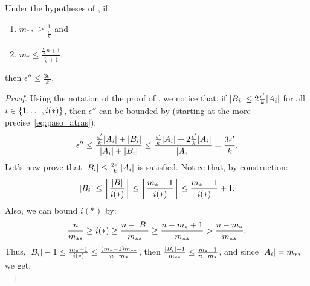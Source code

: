         \begin{remark} \label{rmk:epsilons_proportion_can_be_k}
            Under the hypotheses of , if:
            \begin{enumerate}[label=(\alph*), ref=\alph*]
                \item \label{itm:epsilons_proportion_can_be_k.a} $m_{**} \geq \frac{1}{\frac{\epsilon'}{k}}$ and
                \item \label{itm:epsilons_proportion_can_be_k.b} $m_* \leq \frac{\frac{\epsilon'}{k} n + 1}{\frac{\epsilon'}{k} + 1}$,
            \end{enumerate}
            then $\epsilon'' \leq \frac{3 \epsilon'}{k}$.
            \begin{proof}
                Using the notation of the proof of ,
                we notice that, if $| B_i | \leq 2 \frac{\epsilon'}{k} | A_i |$ for all $i \in \{ 1, \dots, i(*) \}$,
                then $\epsilon''$ can be bounded by (starting at the more precise~\eqref{eq:paso_atras}):
                \[
                    \epsilon'' \leq \frac{\frac{\epsilon'}{k} | A_i | + | B_i |}{| A_i | + | B_i |}
                    \leq \frac{\frac{\epsilon'}{k} | A_i | + 2 \frac{\epsilon'}{k} | A_i |}{| A_i |}
                    = \frac{3 \epsilon'}{k}.
                \]
                Let's now prove that $| B_i | \leq \frac{2 \epsilon'}{k} | A_i |$ is satisfied.
                Notice that, by construction:
                \[
                    | B_i | \leq \left\lceil \frac{| B |}{i(*)} \right\rceil \leq \left\lceil \frac{m_* - 1}{i(*)} \right\rceil \leq
                    \frac{m_* - 1}{i(*)} + 1.
                \]
                Also, we can bound $i(*)$ by:
                \[
                    \frac{n}{m_{**}} \geq i(*) \geq \frac{n - | B |}{m_{**}} \geq \frac{n - m_* + 1}{m_{**}} >
                    \frac{n - m_*}{m_{**}}.
                \]
                Thus, $| B_i | - 1 \leq \frac{m_* - 1}{i(*)} \leq \frac{( m_* - 1 ) m_{**}}{n - m_*}$,
                then $\frac{| B_i | - 1}{m_{**}} \leq \frac{m_* - 1}{n - m_*}$, and since $| A_i | = m_{**}$
                we get:
                \begin{equation} \label{eq:bound_of_Ai_Bi_fraction}

\end{equation}
\end{proof}
\end{remark}
